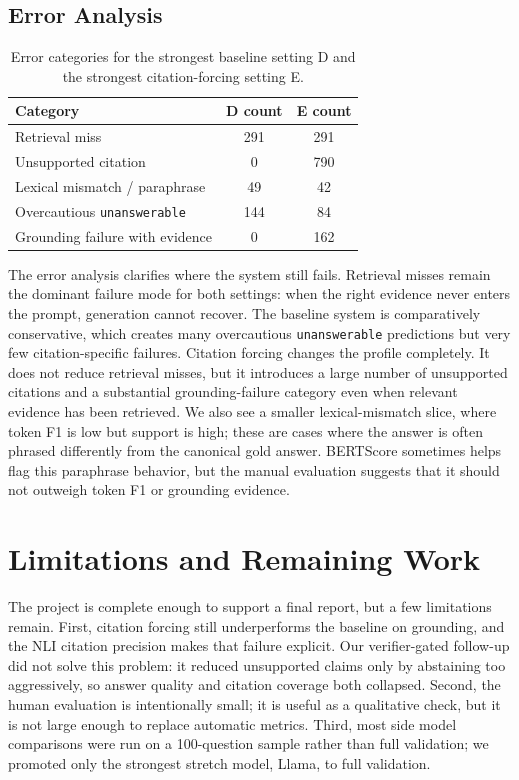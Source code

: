 \documentclass[11pt]{article}
\begin{document}
\subsection{Error Analysis}

\begin{table}[H]
\centering
\small
\begin{tabular}{lcc}
\toprule
Category & D count & E count \\
\midrule
Retrieval miss & 291 & 291 \\
Unsupported citation & 0 & 790 \\
Lexical mismatch / paraphrase & 49 & 42 \\
Overcautious \texttt{unanswerable} & 144 & 84 \\
Grounding failure with evidence & 0 & 162 \\
\bottomrule
\end{tabular}
\caption{Error categories for the strongest baseline setting D and the strongest citation-forcing setting E.}
\label{tab:error}
\end{table}

The error analysis clarifies where the system still fails. Retrieval misses remain the dominant failure mode for both settings: when the right evidence never enters the prompt, generation cannot recover. The baseline system is comparatively conservative, which creates many overcautious \texttt{unanswerable} predictions but very few citation-specific failures. Citation forcing changes the profile completely. It does not reduce retrieval misses, but it introduces a large number of unsupported citations and a substantial grounding-failure category even when relevant evidence has been retrieved. We also see a smaller lexical-mismatch slice, where token F1 is low but support is high; these are cases where the answer is often phrased differently from the canonical gold answer. BERTScore sometimes helps flag this paraphrase behavior, but the manual evaluation suggests that it should not outweigh token F1 or grounding evidence.

\section{Limitations and Remaining Work}

The project is complete enough to support a final report, but a few limitations remain. First, citation forcing still underperforms the baseline on grounding, and the NLI citation precision makes that failure explicit. Our verifier-gated follow-up did not solve this problem: it reduced unsupported claims only by abstaining too aggressively, so answer quality and citation coverage both collapsed. Second, the human evaluation is intentionally small; it is useful as a qualitative check, but it is not large enough to replace automatic metrics. Third, most side model comparisons were run on a 100-question sample rather than full validation; we promoted only the strongest stretch model, Llama, to full validation.
\end{document}
